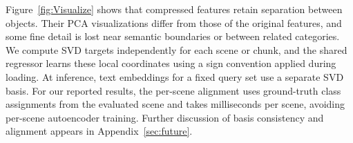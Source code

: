 \documentclass[10pt,twocolumn,letterpaper]{article}
\begin{document}
Figure~\ref{fig:Visualize} shows that compressed features retain separation between objects. Their PCA visualizations differ from those of the original features, and some fine detail is lost near semantic boundaries or between related categories. We compute SVD targets independently for each scene or chunk, and the shared regressor learns these local coordinates using a sign convention applied during loading. At inference, text embeddings for a fixed query set use a separate SVD basis. For our reported results, the per-scene alignment uses ground-truth class assignments from the evaluated scene and takes milliseconds per scene, avoiding per-scene autoencoder training. Further discussion of basis consistency and alignment appears in Appendix~\ref{sec:future}.
\end{document}
